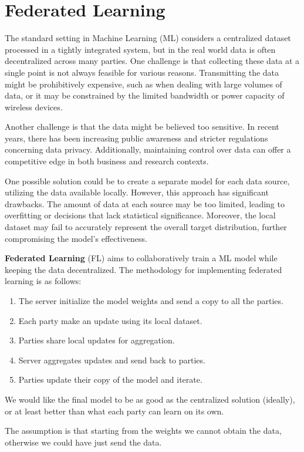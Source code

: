 \chapter{Federated Learning}
The standard setting in Machine Learning (ML) considers a centralized dataset
processed in a tightly integrated system, but in the real world data is often
decentralized across many parties. One challenge is that collecting these data
at a single point is not always feasible for various reasons. Transmitting the
data might be prohibitively expensive, such as when dealing with large volumes
of data, or it may be constrained by the limited bandwidth or power capacity of
wireless devices.

Another challenge is that the data might be believed too sensitive. In recent
years, there has been increasing public awareness and stricter regulations
concerning data privacy. Additionally, maintaining control over data can offer a
competitive edge in both business and research contexts.

One possible solution could be to create a separate model for each data source,
utilizing the data available locally. However, this approach has significant
drawbacks. The amount of data at each source may be too limited, leading to
overfitting or decisions that lack statistical significance. Moreover, the
local dataset may fail to accurately represent the overall target distribution,
further compromising the model's effectiveness.

\textbf{Federated Learning} (FL) aims to collaboratively train a ML model while
keeping the data decentralized. The methodology for implementing federated
learning is as follows:
\begin{enumerate}
    \item The server initialize the model weights and send a copy to all the parties.
    \item Each party make an update using its local dataset.
    \item Parties share local updates for aggregation.
    \item Server aggregates updates and send back to parties.
    \item Parties update their copy of the model and iterate.
\end{enumerate}

We would like the final model to be as good as the centralized solution (ideally),
or at least better than what each party can learn on its own.

\begin{note}
    The assumption is that starting from the weights we cannot obtain the data,
    otherwise we could have just send the data.
\end{note}

